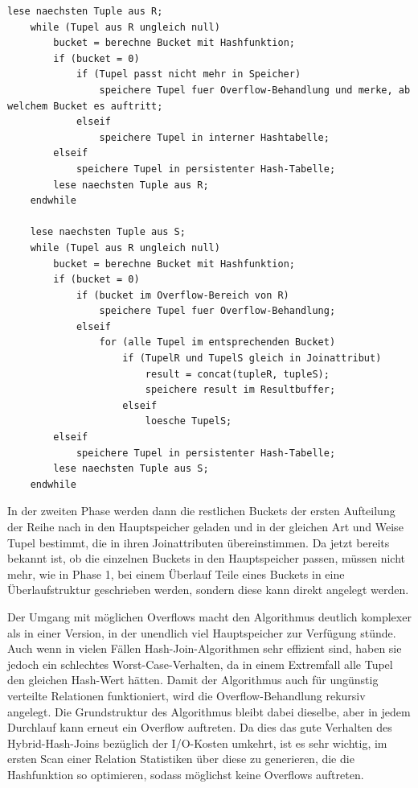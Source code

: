 \documentclass[a4paper,12pt,twoside]{article}
\begin{document}
\begin{minipage}{0.95\textwidth}
	\begin{lstlisting}[caption={Phase 1 Hybrid-Hash-Join.}, label=list:hybrid] 
	lese naechsten Tuple aus R;
	while (Tupel aus R ungleich null) 
		bucket = berechne Bucket mit Hashfunktion;
		if (bucket = 0)
			if (Tupel passt nicht mehr in Speicher)
				speichere Tupel fuer Overflow-Behandlung und merke, ab welchem Bucket es auftritt;
			elseif
				speichere Tupel in interner Hashtabelle;
		elseif
			speichere Tupel in persistenter Hash-Tabelle;
		lese naechsten Tuple aus R;
	endwhile
	
	lese naechsten Tuple aus S;
	while (Tupel aus R ungleich null)
		bucket = berechne Bucket mit Hashfunktion;
		if (bucket = 0)
			if (bucket im Overflow-Bereich von R)
				speichere Tupel fuer Overflow-Behandlung; 
			elseif
				for (alle Tupel im entsprechenden Bucket)
					if (TupelR und TupelS gleich in Joinattribut)
						result = concat(tupleR, tupleS);
						speichere result im Resultbuffer;
					elseif
						loesche TupelS;
		elseif
			speichere Tupel in persistenter Hash-Tabelle;
		lese naechsten Tuple aus S;
	endwhile
	\end{lstlisting}
\end{minipage}

In der zweiten Phase werden dann die restlichen Buckets der ersten Aufteilung der Reihe nach in den Hauptspeicher geladen und in der gleichen Art und Weise Tupel bestimmt, die in ihren Joinattributen übereinstimmen. Da jetzt bereits bekannt ist, ob die einzelnen Buckets in den Hauptspeicher passen, müssen nicht mehr, wie in Phase 1, bei einem Überlauf Teile eines Buckets in eine Überlaufstruktur geschrieben werden, sondern diese kann direkt angelegt werden.

Der Umgang mit möglichen Overflows macht den Algorithmus deutlich komplexer als in einer Version, in der unendlich viel Hauptspeicher zur Verfügung stünde. Auch wenn in vielen Fällen Hash-Join-Algorithmen sehr effizient sind, haben sie jedoch ein schlechtes Worst-Case-Verhalten, da in einem Extremfall alle Tupel den gleichen Hash-Wert hätten. Damit der Algorithmus auch für ungünstig verteilte Relationen funktioniert, wird die Overflow-Behandlung rekursiv angelegt. Die Grundstruktur des Algorithmus bleibt dabei dieselbe, aber in jedem Durchlauf kann erneut ein Overflow auftreten. Da dies das gute Verhalten des Hybrid-Hash-Joins bezüglich der I/O-Kosten umkehrt, ist es sehr wichtig, im ersten Scan einer Relation Statistiken über diese zu generieren, die die Hashfunktion so optimieren, sodass möglichst keine Overflows auftreten.
\end{document}
